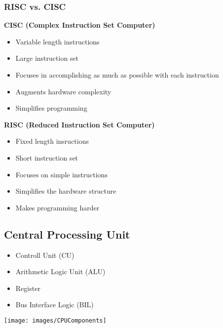 \subsubsection{RISC vs. CISC}
\begin{multicols}{2}
	\textbf{CISC (Complex Instruction Set Computer)}\newline
		\begin{itemize}
			\item Variable length instructions
			\item Large instruction set
			\item Focuses in accomplishing as much as possible with each instruction
			\item Augments hardware complexity
			\item Simplifies programming
		\end{itemize}    
	\textbf{RISC (Reduced Instruction Set Computer)}
		\begin{itemize}
			\item Fixed length insructions
			\item Short instruction set
			\item Focuses on simple instructions
			\item Simplifies the hardware structure
			\item Makes programming harder
		\end{itemize}      
\end{multicols}

\begin{minipage}{9cm}
	\subsection{Central Processing Unit }
	\begin{itemize}
		\item Controll Unit (CU)
		\item Arithmetic Logic Unit (ALU)
		\item Register
		\item Bus Interface Logic (BIL)
	\end{itemize}
\end{minipage}
\begin{minipage}{6cm}
	\texttt{[image: images/CPUComponents]}
\end{minipage}

